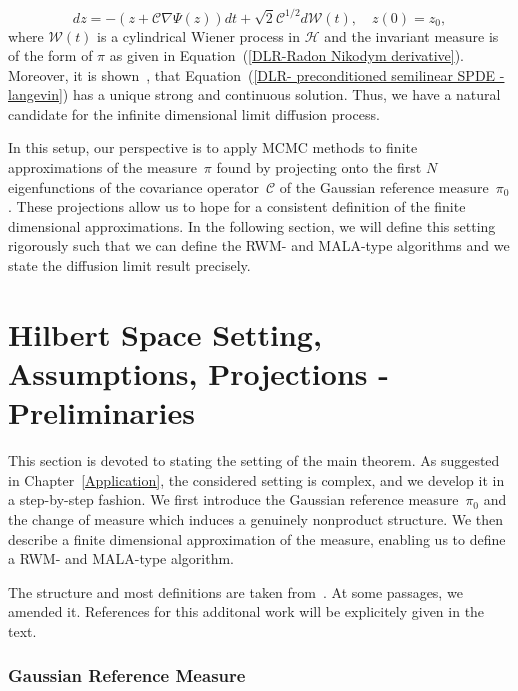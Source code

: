 \begin{equation}
\label{DLR-limit diffusion candidate}
 dz = - ( z + \mathcal{C} \nabla \Psi (z) ) dt + \sqrt{2} \mathcal{C}^{1/2} d \mathcal{W}(t), \quad z(0) = z_0,
\end{equation}
where $ \mathcal{W}(t) $ is a cylindrical Wiener process in $\mathcal{H}$ and the invariant measure is of the form of $\pi$ as given in Equation~(\ref{DLR-Radon Nikodym derivative}). Moreover, it is shown~\autocite[Theorem 3.6]{Hairer2007}, that Equation~(\ref{DLR- preconditioned semilinear SPDE - langevin}) has a unique strong and continuous solution. Thus, we have a natural candidate for the infinite dimensional limit diffusion process.
\newline

In this setup, our perspective is to apply MCMC methods to finite approximations of the measure~$\pi$ found by projecting onto the first $N$ eigenfunctions of the covariance operator~$\mathcal{C}$ of the Gaussian reference measure~$\pi_0$. These projections allow us to hope for a consistent definition of the finite dimensional approximations. In the following section, we will define this setting rigorously such that we can define the RWM- and MALA-type algorithms and we state the diffusion limit result precisely.


\section{Hilbert Space Setting, Assumptions, Projections - Preliminaries}
\label{sec:DLR-Preliminaries}

This section is devoted to stating the setting of the main theorem. As suggested in Chapter~\ref{Application}, the considered setting is complex, and we develop it in a step-by-step fashion. We first introduce the Gaussian reference measure~$\pi_0$ and the change of measure which induces a genuinely nonproduct structure. We then describe a finite dimensional approximation of the measure, enabling us to define a RWM- and MALA-type algorithm.

The structure and most definitions are taken from~\autocite[Section 2]{Pillai2012}. At some passages, we amended it. References for this additonal work will be explicitely given in the text.

\subsubsection{Gaussian Reference Measure}

